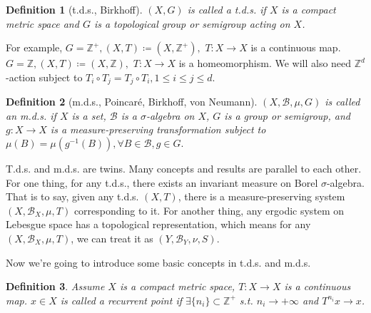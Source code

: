 \documentclass[12pt]{article}
\newtheorem{definition}{Definition}
\begin{document}
\begin{definition}[t.d.s., Birkhoff]
$(X,G) $ is called a t.d.s. if $X$ is a compact metric space and $G$ is a topological group or semigroup acting on $X$.
\end{definition}

For example, $G=\mathbb{Z}^+,(X,T)\coloneqq (X,\mathbb{Z}^+), $ $T:X\to X$ is a continuous map. $G=\mathbb{Z},(X,T)\coloneqq (X,\mathbb{Z}), $ $T:X\to X $ is a homeomorphism. We will also need $\mathbb{Z}^d $-action subject to $T_i \circ T_j=T_j\circ T_i,1\le i\le j \le d. $

\begin{definition}[m.d.s., Poincar\'e, Birkhoff, von Neumann]
$(X, \mathcal{B},\mu, G) $ is called an m.d.s. if $X $ is a set, $\mathcal{B} $ is a $\sigma $-algebra on $X$, $G$ is a group or semigroup, and $ g:X\to X $ is a measure-preserving transformation subject to $\mu(B)=\mu(g^{-1}(B)),\forall B\in \mathcal{B},g\in G. $
\end{definition}

T.d.s. and m.d.s. are twins. Many concepts and results are parallel to each other. For one thing, for any t.d.s., there exists an invariant measure on Borel $\sigma $-algebra. That is to say, given any t.d.s. $(X,T) $, there is a measure-preserving system $(X,\mathcal{B}_X,\mu,T) $ corresponding to it. For another thing, any ergodic system on Lebesgue space has a topological representation, which means for any $ (X,\mathcal{B}_X,\mu,T) $, we can treat it as $(Y,\mathcal{B}_Y,\nu,S) $.

Now we're going to introduce some basic concepts in t.d.s. and m.d.s.
\begin{definition}
Assume $X$ is a compact metric space, $T:X\to X$ is a continuous map. $x\in X$ is called a recurrent point if $\exists \{n_i \} \subset \mathbb{Z}^+ $ s.t. $n_i\to +\infty $ and $T^{n_i}x\to x $.
\end{definition}
\end{document}

